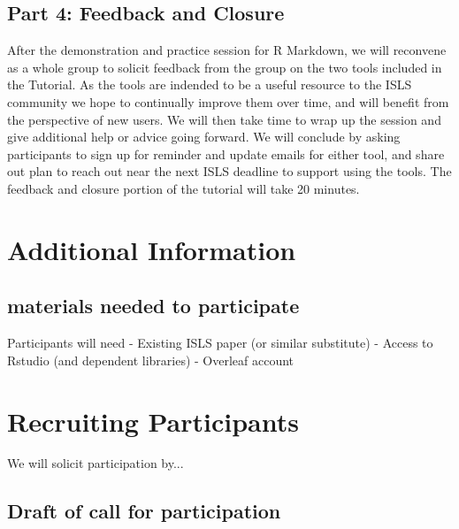 \documentclass{article}
\begin{document}



\subsection{Part 4: Feedback and Closure}
After the demonstration and practice session for R Markdown, we will reconvene as a whole group to solicit feedback from the group on the two tools included in the Tutorial. As the tools are indended to be a useful resource to the ISLS community we hope to continually improve them over time, and will benefit from the perspective of new users. We will then take time to wrap up the session and give additional help or advice going forward. We will conclude by asking participants to sign up for reminder and update emails for either tool, and share out plan to reach out near the next ISLS deadline to support using the tools. The feedback and closure portion of the tutorial will take 20 minutes.



\section{Additional Information}
\subsection{materials needed to participate}
Participants will need
	- Existing ISLS paper (or similar substitute)
	- Access to Rstudio (and dependent libraries)
	- Overleaf account

\section{Recruiting Participants}
We will solicit participation by...
\subsection{Draft of call for participation }



\end{document}
